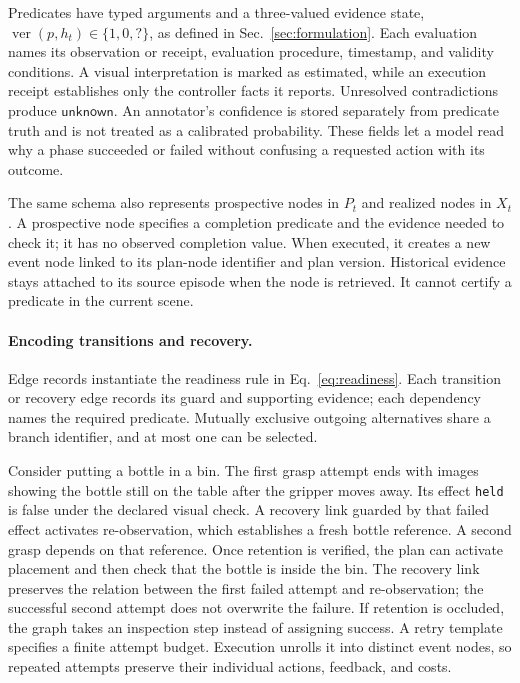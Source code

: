 \documentclass[10pt,twocolumn,letterpaper]{article}
\begin{document}
Predicates have typed arguments and a three-valued evidence state, $\operatorname{ver}(p,h_t)\in\{1,0,?\}$, as defined in Sec.~\ref{sec:formulation}.
Each evaluation names its observation or receipt, evaluation procedure, timestamp, and validity conditions. A visual interpretation is marked as estimated, while an execution receipt establishes only the controller facts it reports. Unresolved contradictions produce \(\mathsf{unknown}\). An annotator's confidence is stored separately from predicate truth and is not treated as a calibrated probability. These fields let a model read why a phase succeeded or failed without confusing a requested action with its outcome.

The same schema also represents prospective nodes in $P_t$ and realized nodes in $X_t$. A prospective node specifies a completion predicate and the evidence needed to check it; it has no observed completion value. When executed, it creates a new event node linked to its plan-node identifier and plan version. Historical evidence stays attached to its source episode when the node is retrieved. It cannot certify a predicate in the current scene.

\paragraph{Encoding transitions and recovery.}
Edge records instantiate the readiness rule in Eq.~\ref{eq:readiness}. Each transition or recovery edge records its guard and supporting evidence; each dependency names the required predicate. Mutually exclusive outgoing alternatives share a branch identifier, and at most one can be selected.

Consider putting a bottle in a bin. The first grasp attempt ends with images showing the bottle still on the table after the gripper moves away. Its effect \texttt{held} is false under the declared visual check. A recovery link guarded by that failed effect activates re-observation, which establishes a fresh bottle reference. A second grasp depends on that reference. Once retention is verified, the plan can activate placement and then check that the bottle is inside the bin. The recovery link preserves the relation between the first failed attempt and re-observation; the successful second attempt does not overwrite the failure. If retention is occluded, the graph takes an inspection step instead of assigning success. A retry template specifies a finite attempt budget. Execution unrolls it into distinct event nodes, so repeated attempts preserve their individual actions, feedback, and costs.
\end{document}
